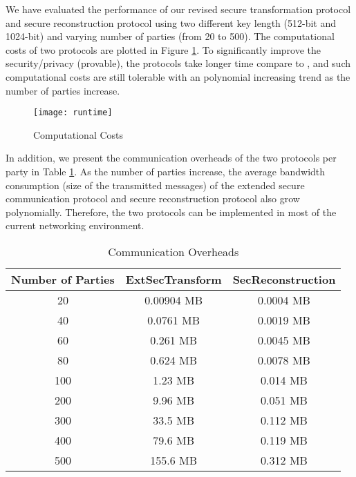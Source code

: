 We have evaluated the performance of our revised secure transformation protocol and secure reconstruction protocol using two different key length (512-bit and 1024-bit) and varying number of parties (from 20 to 500). The computational costs of two protocols are plotted in Figure \ref{fig:runtime}. To significantly improve the security/privacy (provable), the protocols take longer time compare to \cite{HongIJER15}, and such computational costs are still tolerable with an polynomial increasing trend as the number of parties increase. 


\begin{figure}[!tbh]
	\centering
	\texttt{[image: runtime]}\vspace{-0.4in}
	\caption{Computational Costs} \label{fig:runtime}
\end{figure}

In addition, we present the communication overheads of the two protocols per party in Table \ref{tab:comm}. As the number of parties increase, the average bandwidth consumption (size of the transmitted messages) of the extended secure communication protocol and secure reconstruction protocol also grow polynomially.  Therefore, the two protocols can be implemented in most of the current networking environment. 

\begin{table}[!h]
	\small\caption{Communication Overheads} \centering
	\begin{tabular}{|c|c|c|}
		\hline
		Number of Parties& ExtSecTransform & SecReconstruction\\
		\hline
		20&0.00904 MB&0.0004 MB\\
		40&0.0761 MB&0.0019 MB\\
		60&0.261 MB&0.0045 MB\\
		80&0.624 MB&0.0078 MB\\
		100&1.23 MB&0.014 MB\\
		200&9.96 MB&0.051 MB\\
		300&33.5 MB&0.112 MB\\
		400&79.6 MB&0.119 MB\\
		500&155.6 MB&0.312 MB\\
		\hline
	\end{tabular}
	\label{tab:comm}
\end{table}
